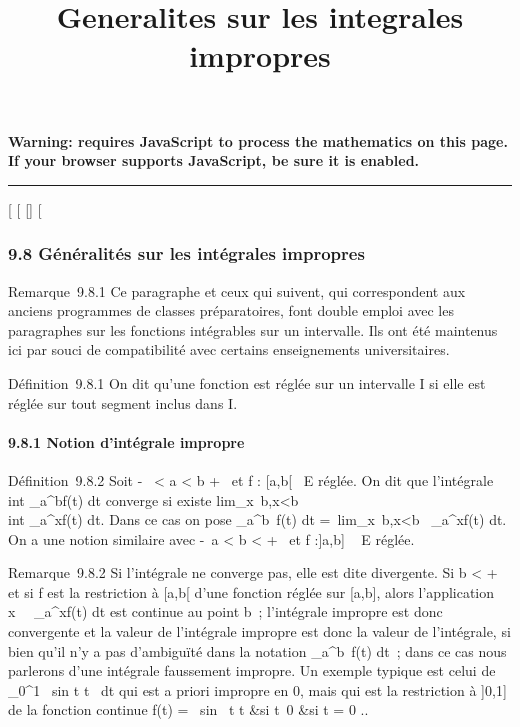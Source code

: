 \documentclass[]{article}
\title{Generalites sur les integrales impropres}
\author{}
\date{}
\begin{document}
\maketitle

\textbf{Warning: 
requires JavaScript to process the mathematics on this page.\\ If your
browser supports JavaScript, be sure it is enabled.}

\begin{center}\rule{3in}{0.4pt}\end{center}

{[}
{[}
{[}{]}
{[}

\subsubsection{9.8 Généralités sur les intégrales impropres}

Remarque~9.8.1 Ce paragraphe et ceux qui suivent, qui correspondent aux
anciens programmes de classes préparatoires, font double emploi avec les
paragraphes sur les fonctions intégrables sur un intervalle. Ils ont été
maintenus ici par souci de compatibilité avec certains enseignements
universitaires.

Définition~9.8.1 On dit qu'une fonction est réglée sur un intervalle I
si elle est réglée sur tout segment inclus dans I.

\paragraph{9.8.1 Notion d'intégrale impropre}

Définition~9.8.2 Soit -\infty~ \textless{} a \textless{} b \leq +\infty~ et f :
{[}a,b{[}\rightarrow~ E réglée. On dit que l'intégrale \\int
 _a^bf(t) dt converge si existe
lim_x\rightarrow~b,x\textless{}b~\\int
 _a^xf(t) dt. Dans ce cas on pose
\int  _a^b~f(t) dt
=\
lim_x\rightarrow~b,x\textless{}b\int ~
_a^xf(t) dt. On a une notion similaire avec -\infty~\leq a
\textless{} b \textless{} +\infty~ et f :{]}a,b{]} \rightarrow~ E réglée.

Remarque~9.8.2 Si l'intégrale ne converge pas, elle est dite divergente.
Si b \textless{} +\infty~ et si f est la restriction à {[}a,b{[} d'une
fonction réglée sur {[}a,b{]}, alors l'application
x\mapsto~\int ~
_a^xf(t) dt est continue au point b~; l'intégrale impropre
est donc convergente et la valeur de l'intégrale impropre est donc la
valeur de l'intégrale, si bien qu'il n'y a pas d'ambiguïté dans la
notation \int  _a^b~f(t) dt~; dans
ce cas nous parlerons d'une intégrale faussement impropre. Un exemple
typique est celui de \int  _0^1~
sin t \over t~ dt qui est a
priori impropre en 0, mais qui est la restriction à {]}0,1{]} de la
fonction continue f(t) = \left \
\cases  sin~ t
\over t &si t\neq~0
 &si t = 0 \cr 
\right ..
\end{document}
